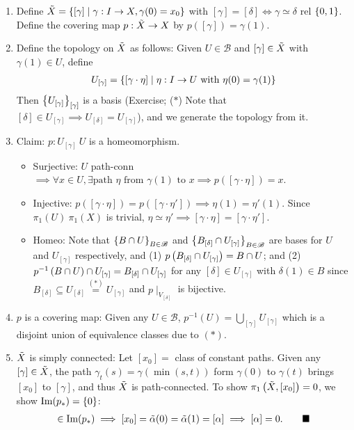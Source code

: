 \documentclass{natsirt}
\newcommand{\scr}{\mathscr}
\newcounter{def}[section]
\begin{document}
\begin{enumerate}
    \item Define $\Tilde{X} = \set{[\gamma]\mid \gamma : I\> X, \gamma(0) = x_0}$ with $[\gamma ]=[\delta] \iff \gamma \simeq \delta$ rel $\set{0,1}$. Define the covering map $p:\Tilde{X}\> X$ by $p([\gamma]) = \gamma(1)$. 
    \item Define the topology on $\Tilde{X}$ as follows: Given $U\in \scr{B}$ and $[\gamma]\in \Tilde{X}$ with $\gamma(1)\in U$, define
    \begin{align*}
        U_{[\gamma]} = \set{[\gamma \cdot \eta]\mid \eta: I\> U \text{ with }\eta(0) =\gamma(1)}
    \end{align*}
    Then $\set{U_{[\gamma]}}_{[\gamma]}$ is a basis (Exercise; ($*$) Note that $[\delta]\in U_{[\gamma]}\implies U_{[\delta]}=U_{[\gamma]}$), and we generate the topology from it.
    \item Claim: $p:U_{[\gamma]}\> U$ is a homeomorphism.
    \begin{itemize}
        \item Surjective: $U$ path-conn $\implies \forall x\in U, \exists \text{path $\eta$ from $\gamma(1)$ to $x$} \implies p([\gamma\cdot \eta]) =x$.
        \item Injective: $p([\gamma\cdot \eta]) = p([\gamma\cdot \eta']) \implies \eta(1) = \eta'(1)$. Since $\pi_1(U)\>\pi_1(X) $ is trivial, $\eta \simeq \eta'\implies [\gamma\cdot \eta]=[\gamma\cdot \eta']$.
        \item Homeo: Note that $\set{B\cap U}_{B\in\scr{B}}$ and $\set{B_{[\delta]}\cap U_{[\gamma]}}_{B\in \scr{B}}$ are bases for $U$ and $U_{[\gamma]}$ respectively, and (1) $p\pr{B_{[\delta]}\cap U_{[\gamma]}} = B\cap U$; and (2) $p^{-1}\pr{B\cap U}\cap U_{[\gamma]} = B_{[\delta]}\cap U_{[\gamma]}$ for any $[\delta]\in U_{[\gamma]}$ with $\delta(1)\in B$ since $B_{[\delta]}\subseteq U_{[\delta]} \stackrel{(*)}{=} U_{[\gamma]}$ and $p\mid_{V_{[\delta]}}$ is bijective.
    \end{itemize}
    \item $p$ is a covering map: Given any $U\in \scr{B}$, $p^{-1}(U) = \bigcup_{[\gamma]} U_{[\gamma]}$ which is a disjoint union of equivalence classes due to $(*)$.
    \item $\Tilde{X}$ is simply connected: Let $[x_0]=$ class of constant paths. Given any $[\gamma]\in \Tilde{X}$, the path $\gamma_t(s) = \gamma(\min(s,t))$ form $\gamma(0)$ to $\gamma(t)$ brings $[x_0]$ to $[\gamma]$, and thus $\Tilde{X}$ is path-connected. To show $\pi_1\pr{\Tilde{X}, [x_0]} = 0$, we show $\text{Im}(p_*) = \set{0}$:
    \begin{align*}
        [\alpha]\in \text{Im}(p_*) \implies [x_0] = \Tilde{\alpha}(0) = \Tilde{\alpha}(1) = [\alpha] \implies [\alpha] = 0.\tag*{\QED}
    \end{align*}
\end{enumerate}
\end{document}
